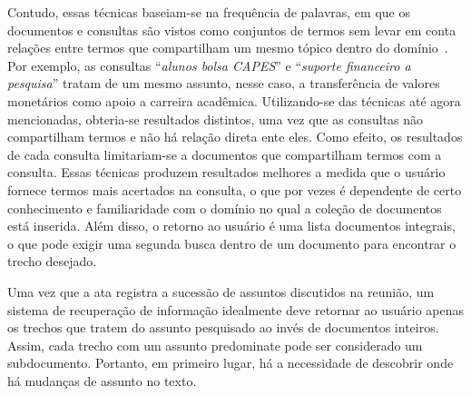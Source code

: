 Contudo, essas técnicas baseiam-se na frequência de palavras, em que os documentos e consultas são vistos como conjuntos de termos sem levar em conta relações entre termos que compartilham um mesmo tópico dentro do domínio~\cite{WEI2006}. Por exemplo, as consultas ``\textit{alunos bolsa CAPES}'' e ``\textit{suporte financeiro a pesquisa}'' tratam de um mesmo assunto, nesse caso, a transferência de valores monetários como apoio a carreira acadêmica. Utilizando-se das técnicas até agora mencionadas, obteria-se resultados distintos, uma vez que as consultas não compartilham termos e não há relação direta ente eles. Como efeito, os resultados de cada consulta limitariam-se a documentos que compartilham termos com a consulta.
Essas técnicas produzem resultados melhores a medida que o usuário fornece termos mais acertados na consulta, o que por vezes é dependente de certo conhecimento e familiaridade com o domínio no qual a coleção de documentos está inserida. Além disso, o retorno ao usuário é uma lista documentos integrais, o que pode exigir uma segunda busca dentro de um documento para encontrar o trecho desejado.





% 
% 
Uma vez que a ata registra a sucessão de assuntos discutidos na reunião, um sistema de recuperação de informação idealmente deve retornar ao usuário apenas os trechos que tratem do assunto pesquisado ao invés de documentos inteiros. Assim, cada trecho com um assunto predominate pode ser considerado um subdocumento. Portanto, em primeiro lugar, há a necessidade de descobrir onde há mudanças de assunto no texto. 




